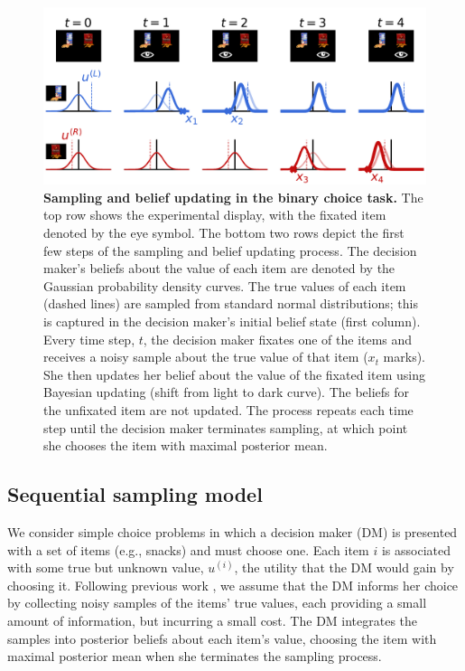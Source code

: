 \begin{figure}[t!]
    \centering
    \includegraphics[width=\textwidth]{figs/attention/Fig1.pdf}
    \caption{\textbf{Sampling and belief updating in the binary choice task.} The top row shows the experimental display, with the fixated item denoted by the eye symbol.  The bottom two rows depict the first few steps of the sampling and belief updating process. The decision maker's beliefs about the value of each item are denoted by the Gaussian probability density curves. The true values of each item (dashed lines) are sampled from standard normal distributions; this is captured in the decision maker's initial belief state (first column). Every time step, $t$, the decision maker fixates one of the items and receives a noisy sample about the true value of that item ($x_t$ marks). She then updates her belief about the value of the fixated item using Bayesian updating (shift from light to dark curve). The beliefs for the unfixated item are not updated. The process repeats each time step until the decision maker terminates sampling, at which point she chooses the item with maximal posterior mean.
  }
  \label{fig1}
\end{figure}

 
\subsection{Sequential sampling model}

We consider simple choice problems in which a decision maker (DM) is presented with a set of items (e.g., snacks) and must choose one. Each item $i$ is associated with some true but unknown value, $u^{(i)}$, the utility that the DM would gain by choosing it. Following previous work \citep{ratcliff2008diffusion,krajbich2010visual,tajima2016optimal,tajima2019optimal,fudenberg2018speed,bogacz2006physics,drugowitsch2012cost,bitzer2014perceptual,gold2002banburismus}, we assume that the DM informs her choice by collecting noisy samples of the items' true values, each providing a small amount of information, but incurring a small cost. The DM integrates the samples into posterior beliefs about each item's value, choosing the item with maximal posterior mean when she terminates the sampling process.

